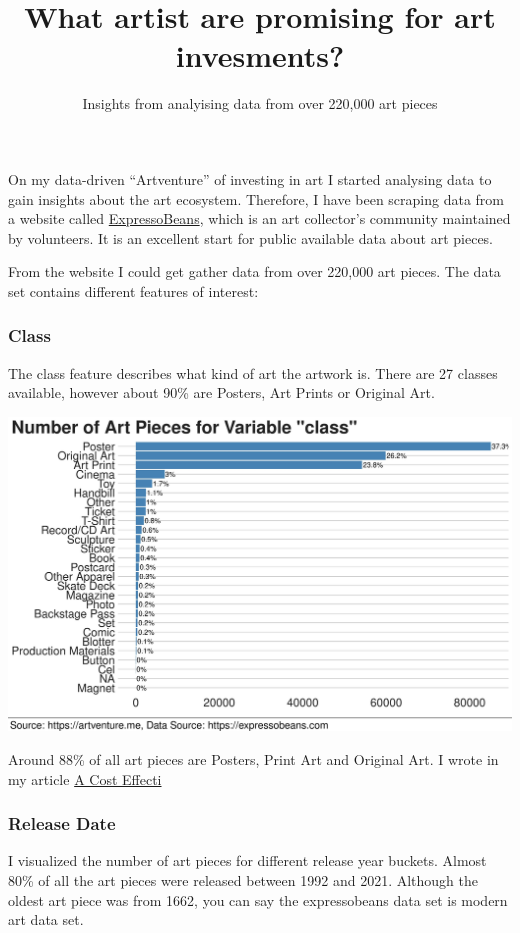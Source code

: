 \documentclass[
]{article}
\title{What artist are promising for art invesments?}
\subtitle{Insights from analyising data from over 220,000 art pieces}
\author{}
\date{\vspace{-2.5em}}
\begin{document}
\maketitle

On my data-driven ``Artventure'' of investing in art I started analysing
data to gain insights about the art ecosystem. Therefore, I have been
scraping data from a website called
\href{https://expressobeans.com}{ExpressoBeans}, which is an art
collector's community maintained by volunteers. It is an excellent start
for public available data about art pieces.

From the website I could get gather data from over 220,000 art pieces.
The data set contains different features of interest:

\hypertarget{class}{%
\subsubsection{Class}\label{class}}

The class feature describes what kind of art the artwork is. There are
27 classes available, however about 90\% are Posters, Art Prints or
Original Art.

\includegraphics[width=46.29in]{class}

Around 88\% of all art pieces are Posters, Print Art and Original Art. I
wrote in my article \href{}{A Cost Effecti}

\hypertarget{release-date}{%
\subsubsection{Release Date}\label{release-date}}

I visualized the number of art pieces for different release year
buckets. Almost 80\% of all the art pieces were released between 1992
and 2021. Although the oldest art piece was from 1662, you can say the
expressobeans data set is modern art data set.
\end{document}

